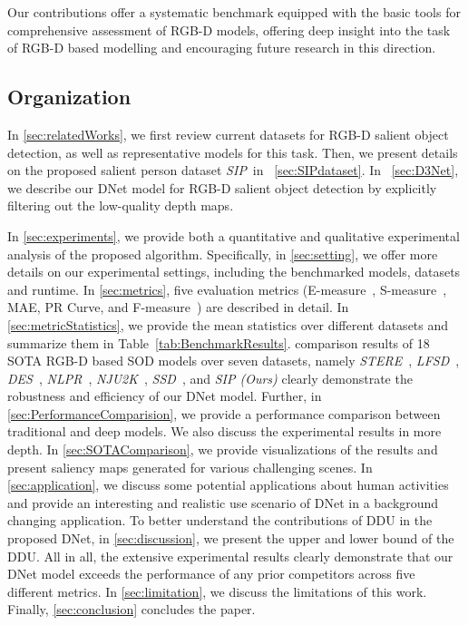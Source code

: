 \documentclass[journal]{IEEEtran}
\newcommand{\tabref}[1]{Table~\ref{#1}}
\newcommand{\secref}[1]{ \ref{#1}}
\newcommand{\fdp}[1]{#1}
\def\ourdataset{\textit{SIP}}
\begin{document}
Our contributions offer a systematic benchmark \fdp{equipped} with the basic tools for
comprehensive assessment of RGB-D models, offering deep insight into the task of RGB-D based modelling
and encouraging future research \fdp{in} this direction.

\subsection{Organization}
In \secref{sec:relatedWorks}, we first review \fdp{current} datasets for
RGB-D salient object detection, \fdp{as well as} representative \fdp{models for this task.}
Then, we present details \fdp{on the} proposed salient person dataset \ourdataset~in~\secref{sec:SIPdataset}.
In~\secref{sec:D3Net}, we describe our DNet model for RGB-D
salient object detection by \fdp{explicitly filtering out the low-quality depth maps.}



In \secref{sec:experiments}, we provide both \fdp{a} quantitative and qualitative
experimental analysis of the proposed algorithm. Specifically,
in \secref{sec:setting}, we offer more details on our experimental
settings, including \fdp{the} benchmarked models, datasets and runtime.
In \secref{sec:metrics}, five evaluation metrics (E-measure~\cite{Fan2018Enhanced}, S-measure~\cite{fan2017structure}, MAE, PR Curve, and F-measure~\cite{achanta2009frequency}) are described in detail.
In \secref{sec:metricStatistics}, \fdp{we provide the mean statistics over different datasets} and summarize them in \tabref{tab:BenchmarkResults}.
\fdp{comparison results of 18 SOTA RGB-D based SOD models over seven datasets}, namely \textit{STERE}~\cite{niu2012leveraging}, \textit{LFSD}~\cite{li2014saliency},
\textit{DES}~\cite{cheng2014depth}, \textit{NLPR}~\cite{peng2014rgbd}, \textit{NJU2K}~\cite{ju2014depth},
\textit{SSD}~\cite{zhu2017three}, and \emph{SIP (Ours)} clearly demonstrate the robustness and efficiency of our DNet model.
Further, in \secref{sec:PerformanceComparision},
we provide \fdp{a} performance comparison between traditional and deep models.
We also \fdp{discuss the experimental results in more depth.}
In \secref{sec:SOTAComparison}, we provide visualizations of the
results and \fdp{present} saliency maps generated \fdp{for} various challenging scenes.
In \secref{sec:application}, we discuss some potential applications about human activities and provide an interesting \fdp{and} realistic
use scenario of DNet in a background changing application.
To better understand the contributions of
\fdp{DDU} in the proposed DNet, in \secref{sec:discussion}, we present the
upper and lower bound of the DDU.
All in all, the extensive experimental
results clearly demonstrate that our DNet model exceeds the performance
of any prior competitors across \fdp{five} different metrics.
In \secref{sec:limitation}, we discuss the limitation\fdp{s} of this work.
Finally, \secref{sec:conclusion} concludes the paper.
\end{document}
